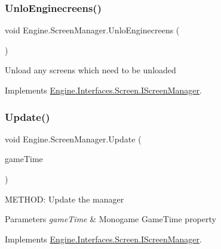 \mbox{\label{a00538_a1e85d6cc74fdb929f4729d1170886fb4}} 
\subsubsection{\texorpdfstring{Unlo\+Enginecreens()}{UnloEnginecreens()}}
{\footnotesize\ttfamily void Engine.\+Screen\+Manager.\+Unlo\+Enginecreens (\begin{DoxyParamCaption}{ }\end{DoxyParamCaption})\hspace{0.3cm}{\ttfamily [inline]}}



Unload any screens which need to be unloaded 



Implements \hyperlink{a00470_a8d30874c7b1b2728a784de0c6e6f80e3}{Engine.\+Interfaces.\+Screen.\+I\+Screen\+Manager}.

\mbox{\label{a00538_a9abaa968b161ebb2b84c7a47ada52f90}} 
\subsubsection{\texorpdfstring{Update()}{Update()}}
{\footnotesize\ttfamily void Engine.\+Screen\+Manager.\+Update (\begin{DoxyParamCaption}\item[{Game\+Time}]{game\+Time }\end{DoxyParamCaption})\hspace{0.3cm}{\ttfamily [inline]}}



M\+E\+T\+H\+OD\+: Update the manager 


\begin{DoxyParams}{Parameters}
{\em game\+Time} & Monogame Game\+Time property\\
\hline
\end{DoxyParams}


Implements \hyperlink{a00470_afc42708b653397ca8a3a81dc8d244c61}{Engine.\+Interfaces.\+Screen.\+I\+Screen\+Manager}.


